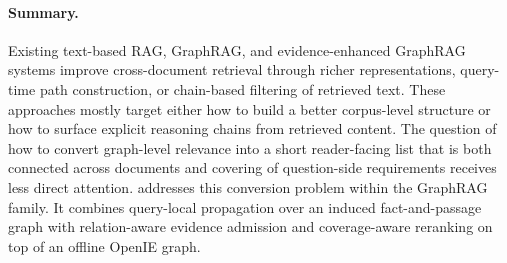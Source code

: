 \paragraph{Summary.}
Existing text-based RAG, GraphRAG, and evidence-enhanced GraphRAG
systems improve cross-document retrieval through richer
representations, query-time path construction, or chain-based
filtering of retrieved text. These approaches mostly target either
how to build a better corpus-level structure or how to surface
explicit reasoning chains from retrieved content. The question of
how to convert graph-level relevance into a short reader-facing
list that is both connected across documents and covering of
question-side requirements receives less direct attention.
\methodname{} addresses this conversion problem within the GraphRAG
family. It combines query-local propagation over an induced
fact-and-passage graph with relation-aware evidence admission and
coverage-aware reranking on top of an offline OpenIE graph.
